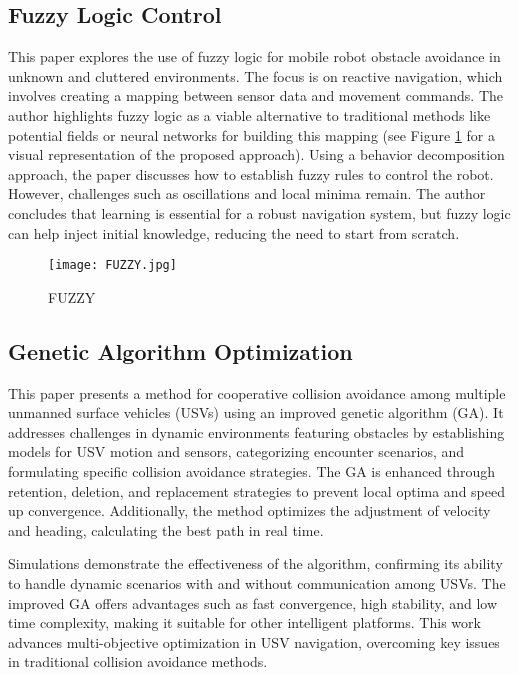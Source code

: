 \documentclass[12pt,twocolumn]{article}
\begin{document}
\subsection{Fuzzy Logic Control}
This paper explores the use of fuzzy logic for mobile robot obstacle avoidance in unknown and cluttered environments. The focus is on reactive navigation, which involves creating a mapping between sensor data and movement commands. The author highlights fuzzy logic as a viable alternative to traditional methods like potential fields or neural networks for building this mapping (see Figure \ref{fig_FUZZY} for a visual representation of the proposed approach). Using a behavior decomposition approach, the paper discusses how to establish fuzzy rules to control the robot. However, challenges such as oscillations and local minima remain. The author concludes that learning is essential for a robust navigation system, but fuzzy logic can help inject initial knowledge, reducing the need to start from scratch.
\begin{figure}[h]
\centering
\texttt{[image: FUZZY.jpg]}
\caption{FUZZY}
\label{fig_FUZZY}
\end{figure}

\subsection{Genetic Algorithm Optimization}

This paper presents a method for cooperative collision avoidance among multiple unmanned surface vehicles (USVs) using an improved genetic algorithm (GA). It addresses challenges in dynamic environments featuring obstacles by establishing models for USV motion and sensors, categorizing encounter scenarios, and formulating specific collision avoidance strategies. The GA is enhanced through retention, deletion, and replacement strategies to prevent local optima and speed up convergence. Additionally, the method optimizes the adjustment of velocity and heading, calculating the best path in real time.

Simulations demonstrate the effectiveness of the algorithm, confirming its ability to handle dynamic scenarios with and without communication among USVs. The improved GA offers advantages such as fast convergence, high stability, and low time complexity, making it suitable for other intelligent platforms. This work advances multi-objective optimization in USV navigation, overcoming key issues in traditional collision avoidance methods.
\end{document}
